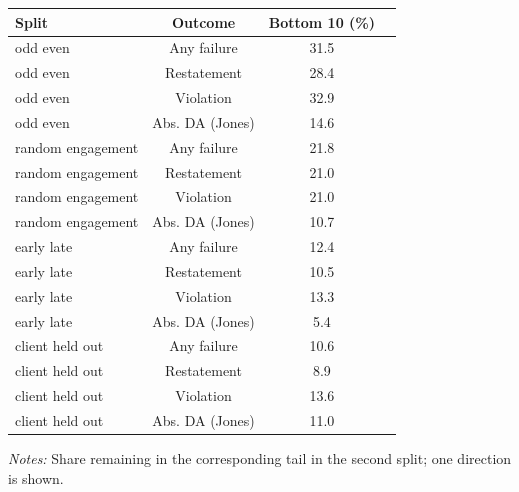 \documentclass[10pt]{article}
\begin{document}
\begin{minipage}{19cm}\fontsize{10}{12}\selectfont\setlength{\tabcolsep}{4pt}\renewcommand{\arraystretch}{1.12}


\centering
{}
\begin{threeparttable}
\begin{tabular}{p{}ccc}
\toprule
Split & Outcome & Bottom 10 (\%) &  \\
\midrule
odd even & Any failure & 31.5 &  \\
odd even & Restatement & 28.4 &  \\
odd even & Violation & 32.9 &  \\
odd even & Abs. DA (Jones) & 14.6 &  \\
random engagement & Any failure & 21.8 &  \\
random engagement & Restatement & 21.0 &  \\
random engagement & Violation & 21.0 &  \\
random engagement & Abs. DA (Jones) & 10.7 &  \\
early late & Any failure & 12.4 &  \\
early late & Restatement & 10.5 &  \\
early late & Violation & 13.3 &  \\
early late & Abs. DA (Jones) & 5.4 &  \\
client held out & Any failure & 10.6 &  \\
client held out & Restatement & 8.9 &  \\
client held out & Violation & 13.6 &  \\
client held out & Abs. DA (Jones) & 11.0 &  \\
\bottomrule
\end{tabular}
\begin{tablenotes}\fontsize{9}{11}\selectfont
\item \raggedright \fontsize{9}{11}\selectfont \textit{Notes:} Share remaining in the corresponding tail in the second split; one direction is shown.
\end{tablenotes}
\end{threeparttable}

\end{minipage}
\end{document}
